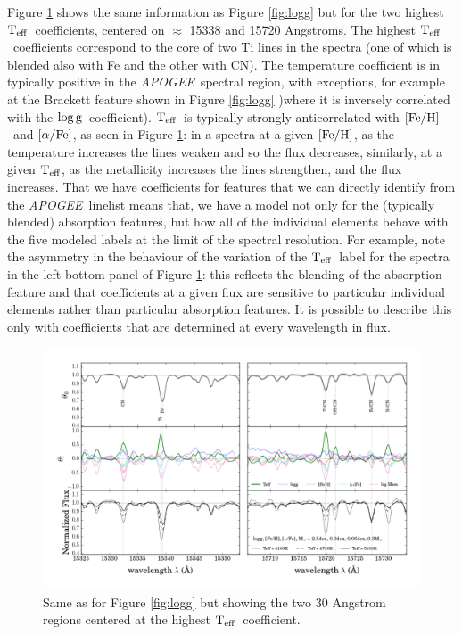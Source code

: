 \documentclass[12pt, preprint]{aastex}
\newcommand{\project}[1]{\textsl{#1}}
\newcommand{\apogee}{\project{APOGEE}}
\newcommand{\teff}{\mbox{$\rm T_{eff}$}}
\newcommand{\feh}{\mbox{$\rm [Fe/H]$}}
\newcommand{\alphafe}{\mbox{$\rm [\alpha/Fe]$}}
\newcommand{\logg}{\mbox{$\rm \log g$}}
\begin{document}
Figure \ref{fig:teff} shows the same information as Figure \ref{fig:logg} but for the two highest \teff\ coefficients, centered on $\approx$ 15338 and 15720 Angstroms. The highest \teff\ coefficients correspond to the core of two Ti lines in the spectra (one of which is blended also with Fe and the other with CN). The temperature coefficient is in typically positive in the \apogee\ spectral region, with exceptions, for example at the Brackett feature shown in Figure \ref{fig:logg} )where it is inversely correlated with the \logg\ coefficient). \teff\ is typically strongly anticorrelated with \feh\ and \alphafe, as seen in Figure \ref{fig:teff}: in a spectra at a given \feh, as the temperature increases the lines weaken and so the flux decreases, similarly, at a given \teff, as the metallicity increases the lines strengthen, and the flux increases. That we have coefficients for features that we can directly identify from the \apogee\ linelist means that, we have a model not only for the (typically blended) absorption features, but how all of the individual elements behave with the five modeled labels at the limit of the spectral resolution. For example, note the asymmetry in the behaviour of the variation of the \teff\ label for the spectra in the left bottom panel of Figure \ref{fig:teff}: this reflects the blending of the absorption feature and that coefficients at a given flux are sensitive to  particular individual elements rather than particular absorption features. It is possible to describe this only with  coefficients that are determined at every wavelength in flux. 

\begin{figure}[p!]
\centering
    \includegraphics[scale=0.51]{./plots/coeffs_t_3.png}
  \caption{Same as for Figure \ref{fig:logg} but showing the two 30 Angstrom regions centered at the highest \teff\ coefficient.}
\label{fig:teff}
\end{figure}
\end{document}

